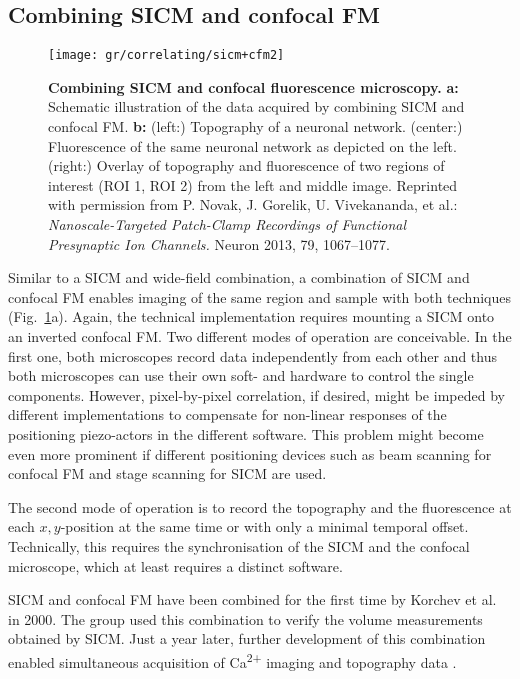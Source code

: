 \subsection{Combining SICM and confocal FM}

\begin{figure}
  \texttt{[image: gr/correlating/sicm+cfm2]}
  \caption{%
    \textbf{Combining SICM and confocal fluorescence microscopy.}
    \textbf{a:} Schematic illustration of the data acquired by combining SICM and confocal FM.
    \textbf{b:} 
    	(left:) Topography of a neuronal network.
    	(center:) Fluorescence of the same neuronal network as depicted on the left.
    	(right:) Overlay of topography and fluorescence of two regions of interest (ROI 1, ROI 2) from
    	the left and middle image.
    Reprinted with permission from P. Novak, J. Gorelik, U. Vivekananda, et
    al.: \emph{Nanoscale-Targeted Patch-Clamp Recordings of Functional
      Presynaptic Ion Channels.} Neuron 2013, 79, 1067--1077.
  }
  \label{fig:sicm+cfm}
\end{figure}

Similar to a SICM and wide-field combination, a combination of SICM and
confocal FM enables imaging of the same region and sample with both techniques
(Fig.~\ref{fig:sicm+cfm}a). Again, the technical implementation requires mounting a
SICM onto an inverted confocal FM. Two different modes of operation are
conceivable. In the first one, both microscopes record data
independently from each other and thus both microscopes can use their own
soft- and hardware to control the single components. However, pixel-by-pixel
correlation, if desired, might be impeded by different
implementations to compensate for non-linear responses of the positioning
piezo-actors in the different software. This problem might become even more
prominent if different positioning devices such as beam scanning for confocal
FM and stage scanning for SICM are used.

The second mode of operation is to record the topography and the fluorescence at each
$x, y$-position at the same time or with only a minimal temporal
offset. Technically, this requires the synchronisation of the SICM and the
confocal microscope, which at least requires a distinct software.  

SICM and confocal FM have been combined for the first time by Korchev et al.
\cite{Korchev2000} in 2000. The group used this combination to verify the
volume measurements obtained by SICM. Just a year later, further development
of this combination enabled simultaneous acquisition of Ca\textsuperscript{2+}
imaging and topography data \cite{Shevchuk2001}.

